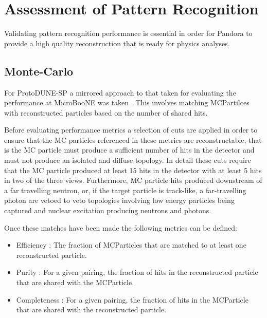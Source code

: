 \section{Assessment of Pattern Recognition}

Validating pattern recognition performance is essential in order for Pandora to provide a high quality reconstruction that is ready for physics analyses.  

\subsection{Monte-Carlo}
\label{sec:mcmetrics}

For ProtoDUNE-SP a mirrored approach to that taken for evaluating the performance at MicroBooNE was taken \cite{pandorauboone}.  This involves matching MCPartilces with reconstructed particles based on the number of shared hits.  

Before evaluating performance metrics a selection of cuts are applied in order to ensure that the MC particles referenced in these metrics are reconstructable, that is the MC particle must produce a sufficient number of hits in the detector and must not produce an isolated and diffuse topology.  In detail these cuts require that the MC particle produced at least 15 hits in the detector with at least 5 hits in two of the three views.  Furthermore, MC particle hits produced downstream of a far travelling neutron, or, if the target particle is track-like, a far-travelling photon are vetoed to veto topologies involving low energy particles being captured and nuclear excitation producing neutrons and photons.

Once these matches have been made the following metrics can be defined:

\begin{itemize}
    \item Efficiency : The fraction of MCParticles that are matched to at least one reconstructed particle.
    \item Purity : For a given pairing, the fraction of hits in the reconstructed particle that are shared with the MCParticle.
    \item Completeness : For a given pairing, the fraction of hits in the MCParticle that are shared with the reconstructed particle.
\end{itemize}

